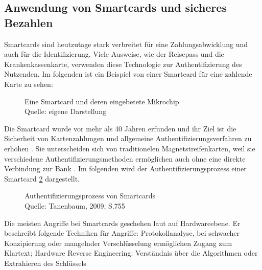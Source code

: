 \subsection{Anwendung von Smartcards und sicheres Bezahlen}
Smartcards sind heutzutage stark verbreitet für eine Zahlungsabwicklung und auch für die Identifizierung.
Viele Ausweise, wie der Reisepass und die Krankenkassenkarte, verwenden diese Technologie zur Authentifizierung
des Nutzenden. Im folgenden ist ein Beispiel von einer Smartcard für eine zahlende Karte zu sehen: 

\begin{figure}[H]
   \caption{Eine Smartcard und deren eingebetete Mikrochip\\Quelle: eigene Darstellung}
   \label{fig:eigenes_Bild}
\end{figure}

Die Smartcard wurde vor mehr als 40 Jahren erfunden und ihr Ziel ist die Sicherheit von Kartenzahlungen und 
allgemeine Authentifizierungsverfahren zu erhöhen \cite{refip:JFSB}. Sie unterscheiden sich von traditionelen 
Magnetstreifenkarten, weil sie verschiedene Authentifizierungsmethoden ermöglichen auch ohne eine direkte 
Verbindung zur Bank \cite{refbook:ATMS}. Im folgenden wird der Authentifizierungsprozess einer Smartcard 
\ref{fig:refbook_ATMS} dargestellt. 

\begin{figure}[H]
   \caption{Authentifizierungsprozess von Smartcards\\Quelle: Tanenbaum, 2009, S.755}
   \label{fig:refbook_ATMS}
\end{figure}

Die meisten Angriffe bei Smartcards geschehen laut \cite{refmas:ASSS} auf Hardwareebene. Er beschreibt folgende 
Techniken für Angriffe: Protokollanalyse, bei schwacher Konzipierung oder mangelnder Verschlüsselung ermöglichen Zugang 
zum Klartext; Hardware Reverse Engineering: Verständnis über die Algorithmen oder Extrahieren des Schlüssels


